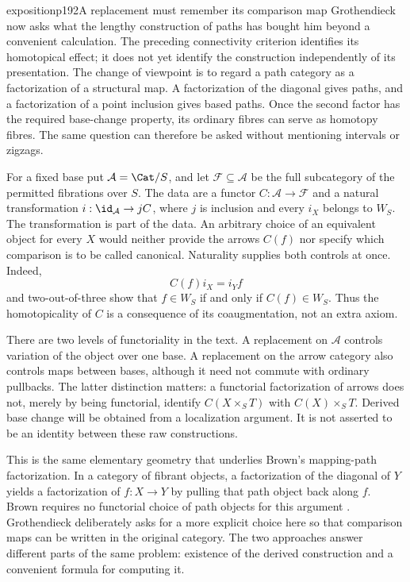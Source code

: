 \begin{dcomment}{exposition}{p192}{A replacement must remember its comparison map}
Grothendieck now asks what the lengthy construction of paths has bought him beyond a convenient calculation. The preceding connectivity criterion identifies its homotopical effect; it does not yet identify the construction independently of its presentation. The change of viewpoint is to regard a path category as a factorization of a structural map. A factorization of the diagonal gives paths, and a factorization of a point inclusion gives based paths. Once the second factor has the required base-change property, its ordinary fibres can serve as homotopy fibres. The same question can therefore be asked without mentioning intervals or zigzags.

For a fixed base put $\mathcal A=\Cat/S$, and let $\mathcal F\subseteq\mathcal A$ be the full subcategory of the permitted fibrations over $S$. The data are a functor $C:\mathcal A\to\mathcal F$ and a natural transformation $i:\id_{\mathcal A}\to jC$, where $j$ is inclusion and every $i_X$ belongs to $W_S$. The transformation is part of the data. An arbitrary choice of an equivalent object for every $X$ would neither provide the arrows $C(f)$ nor specify which comparison is to be called canonical. Naturality supplies both controls at once. Indeed,
\[
 C(f)i_X=i_Yf
\]
and two-out-of-three show that $f\in W_S$ if and only if $C(f)\in W_S$. Thus the homotopicality of $C$ is a consequence of its coaugmentation, not an extra axiom.

There are two levels of functoriality in the text. A replacement on $\mathcal A$ controls variation of the object over one base. A replacement on the arrow category also controls maps between bases, although it need not commute with ordinary pullbacks. The latter distinction matters: a functorial factorization of arrows does not, merely by being functorial, identify $C(X\times_S T)$ with $C(X)\times_S T$. Derived base change will be obtained from a localization argument. It is not asserted to be an identity between these raw constructions.

This is the same elementary geometry that underlies Brown's mapping-path factorization. In a category of fibrant objects, a factorization of the diagonal of $Y$ yields a factorization of $f:X\to Y$ by pulling that path object back along $f$. Brown requires no functorial choice of path objects for this argument \citep[Part I, \S1, pp.~420--422]{Brown1973}. Grothendieck deliberately asks for a more explicit choice here so that comparison maps can be written in the original category. The two approaches answer different parts of the same problem: existence of the derived construction and a convenient formula for computing it.
\end{dcomment}

